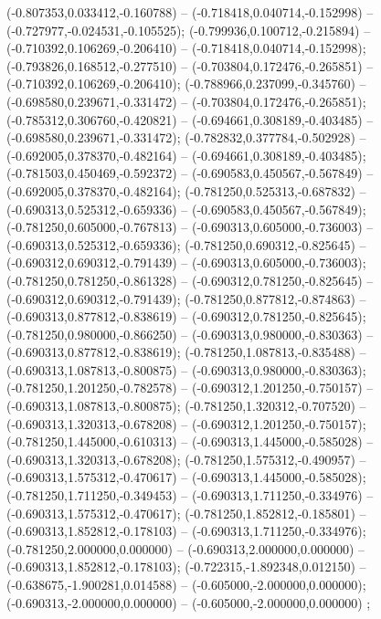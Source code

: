  (-0.807353,0.033412,-0.160788) -- (-0.718418,0.040714,-0.152998) -- (-0.727977,-0.024531,-0.105525);
 (-0.799936,0.100712,-0.215894) -- (-0.710392,0.106269,-0.206410) -- (-0.718418,0.040714,-0.152998);
 (-0.793826,0.168512,-0.277510) -- (-0.703804,0.172476,-0.265851) -- (-0.710392,0.106269,-0.206410);
 (-0.788966,0.237099,-0.345760) -- (-0.698580,0.239671,-0.331472) -- (-0.703804,0.172476,-0.265851);
 (-0.785312,0.306760,-0.420821) -- (-0.694661,0.308189,-0.403485) -- (-0.698580,0.239671,-0.331472);
 (-0.782832,0.377784,-0.502928) -- (-0.692005,0.378370,-0.482164) -- (-0.694661,0.308189,-0.403485);
 (-0.781503,0.450469,-0.592372) -- (-0.690583,0.450567,-0.567849) -- (-0.692005,0.378370,-0.482164);
 (-0.781250,0.525313,-0.687832) -- (-0.690313,0.525312,-0.659336) -- (-0.690583,0.450567,-0.567849);
 (-0.781250,0.605000,-0.767813) -- (-0.690313,0.605000,-0.736003) -- (-0.690313,0.525312,-0.659336);
 (-0.781250,0.690312,-0.825645) -- (-0.690312,0.690312,-0.791439) -- (-0.690313,0.605000,-0.736003);
 (-0.781250,0.781250,-0.861328) -- (-0.690312,0.781250,-0.825645) -- (-0.690312,0.690312,-0.791439);
 (-0.781250,0.877812,-0.874863) -- (-0.690313,0.877812,-0.838619) -- (-0.690312,0.781250,-0.825645);
 (-0.781250,0.980000,-0.866250) -- (-0.690313,0.980000,-0.830363) -- (-0.690313,0.877812,-0.838619);
 (-0.781250,1.087813,-0.835488) -- (-0.690313,1.087813,-0.800875) -- (-0.690313,0.980000,-0.830363);
 (-0.781250,1.201250,-0.782578) -- (-0.690312,1.201250,-0.750157) -- (-0.690313,1.087813,-0.800875);
 (-0.781250,1.320312,-0.707520) -- (-0.690313,1.320313,-0.678208) -- (-0.690312,1.201250,-0.750157);
 (-0.781250,1.445000,-0.610313) -- (-0.690313,1.445000,-0.585028) -- (-0.690313,1.320313,-0.678208);
 (-0.781250,1.575312,-0.490957) -- (-0.690313,1.575312,-0.470617) -- (-0.690313,1.445000,-0.585028);
 (-0.781250,1.711250,-0.349453) -- (-0.690313,1.711250,-0.334976) -- (-0.690313,1.575312,-0.470617);
 (-0.781250,1.852812,-0.185801) -- (-0.690313,1.852812,-0.178103) -- (-0.690313,1.711250,-0.334976);
 (-0.781250,2.000000,0.000000) -- (-0.690313,2.000000,0.000000) -- (-0.690313,1.852812,-0.178103);
 (-0.722315,-1.892348,0.012150) -- (-0.638675,-1.900281,0.014588) -- (-0.605000,-2.000000,0.000000);
 (-0.690313,-2.000000,0.000000) -- (-0.605000,-2.000000,0.000000) ;
